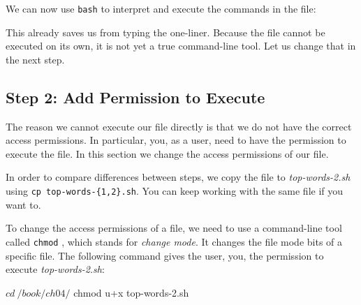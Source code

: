\documentclass[
]{book}
\newenvironment{Shaded}{\begin{snugshade}}{\end{snugshade}}
\newcommand{\BuiltInTok}[1]{#1}
\newcommand{\ExtensionTok}[1]{#1}
\newcommand{\FunctionTok}[1]{\textcolor[rgb]{0.00,0.00,0.00}{#1}}
\newcommand{\NormalTok}[1]{#1}
\theoremstyle{definition}
\theoremstyle{definition}
\theoremstyle{definition}
\theoremstyle{remark}
\begin{document}
We can now use \texttt{bash} \citep{bash} to interpret and execute the commands in the file:

\begin{Shaded}
\end{Shaded}

This already saves us from typing the one-liner. Because the file cannot be executed on its own, it is not yet a true command-line tool. Let us change that in the next step.

\hypertarget{step-2-add-permission-to-execute}{%
\subsection{Step 2: Add Permission to Execute}\label{step-2-add-permission-to-execute}}

The reason we cannot execute our file directly is that we do not have the correct access permissions. In particular, you, as a user, need to have the permission to execute the file. In this section we change the access permissions of our file.

\begin{rmdnote}
In order to compare differences between steps, we copy the file to \emph{top-words-2.sh} using \texttt{cp\ top-words-\{1,2\}.sh}. You can keep working with the same file if you want to.
\end{rmdnote}

To change the access permissions of a file, we need to use a command-line tool called \texttt{chmod} \citep{chmod}, which stands for \emph{change mode}. It changes the file mode bits of a specific file. The following command gives the user, you, the permission to execute \emph{top-words-2.sh}:

\begin{Shaded}
\begin{Highlighting}[]
\NormalTok{$ }\BuiltInTok{cd}\NormalTok{ ~/book/ch04/}
\NormalTok{$ }\FunctionTok{chmod}\NormalTok{ u+x top-words-2.sh}
\end{Highlighting}
\end{Shaded}
\end{document}
